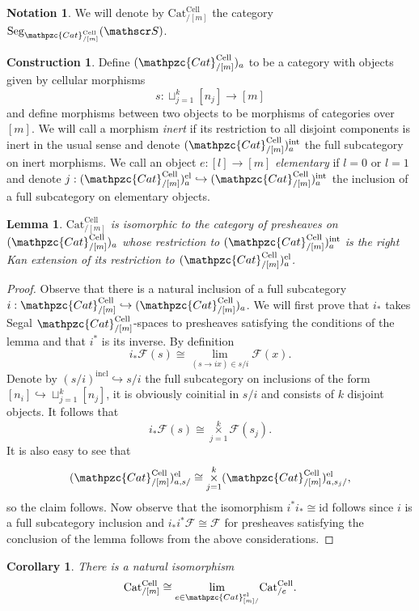 \documentclass[a4paper, reqno]{amsart}
\newtheorem{cor}[theorem]{Corollary}
\newtheorem{lemma}[theorem]{Lemma}
\theoremstyle{definition}
\newtheorem{notation}[theorem]{Notation}
\newtheorem{construction}[theorem]{Construction}
\newcommand\cF{\mathscr F}
\newcommand\cS{\mathscr S}
\newcommand\id{\mathrm{id}}
\newcommand\cat{\mathrm{Cat}}
\newcommand\ccat{\mathpzc{Cat}}
\newcommand\cell{\mathrm{Cell}}
\newcommand\inrt{\mathrm{int}}
\newcommand\el{\mathrm{el}}
\newcommand{\mElo}[2]{\mathpzc{#1}^{\mathrm{el}}_{#2/}}
\begin{document}
\begin{notation}
We will denote by  $\mathrm{Cat}^{\mathrm{Cell}}_{/[m]}$ the category $\mathrm{Seg}_{\mathpzc{Cat}^\mathrm{Cell}_{/[m]}}(\cS)$.
\end{notation}
\begin{construction}\label{constr:corr_aux}
Define $(\ccat^\cell_{/[m]})_a$ to be a category with objects given by cellular morphisms \[s:\sqcup_{j=1}^k[n_j]\rightarrow[m]\]
and define morphisms between two objects to be morphisms of categories over $[m]$. We will call a morphism \textit{inert} if its restriction to all disjoint components is inert in the usual sense and denote $(\ccat^\cell_{/[m]})_a^\inrt$ the full subcategory on inert morphisms. We call an object $e:[l]\rightarrow[m]$ \textit{elementary} if $l=0$ or $l=1$ and denote $j:(\ccat^\cell_{/[m]})_a^\el\hookrightarrow(\ccat^\cell_{/[m]})_a^\inrt$ the inclusion of a full subcategory on elementary objects.
\end{construction}
\begin{lemma}
$\cat^\cell_{/[m]}$ is isomorphic to the category of presheaves on $(\ccat^\cell_{/[m]})_a$ whose restriction to $(\ccat^\cell_{/[m]})_a^\inrt$ is the right Kan extension of its restriction to $(\ccat^\cell_{/[m]})_a^\el$.
\end{lemma}
\begin{proof}
Observe that there is a natural inclusion of a full subcategory $i:\ccat^\cell_{/[m]}\hookrightarrow(\ccat^\cell_{/[m]})_a$. We will first prove that $i_*$ takes Segal $\ccat^\cell_{/[m]}$-spaces to presheaves satisfying the conditions of the lemma and that $i^*$ is its inverse. By definition
\[i_*\cF(s)\cong\underset{(s\rightarrow ix)\in s/i}{\lim}\cF(x).\]
Denote by $(s/i)^\mathrm{incl}\hookrightarrow s/i$ the full subcategory on inclusions of the form $[n_i]\hookrightarrow\sqcup_{j=1}^k[n_j]$, it is obviously coinitial in $s/i$ and consists of $k$ disjoint objects. It follows that 
\[i_*\cF(s)\cong \mathop{\times}\limits_{j=1}^k\cF(s_j).\]
It is also easy to see that 
\[(\ccat^\cell_{/[m]})^\el_{a,s/}\cong \mathop{\times}\limits_{j=1}^k(\ccat^\cell_{/[m]})^\el_{a,s_j/},\]
so the claim follows. Now observe that the isomorphism $i^*i_*\cong\id$ follows since $i$ is a full subcategory inclusion and $i_*i^*\cF\cong\cF$ for presheaves satisfying the conclusion of the lemma follows from the above considerations.
\end{proof}
\begin{cor}\label{cor:iso}
There is a natural isomorphism
\[\mathrm{Cat}^{\mathrm{Cell}}_{/[m]}\cong\underset{e\in\mElo{Cat}{[m]}}{\lim}\mathrm{Cat}^{\mathrm{Cell}}_{/e}.\]
\end{cor}
\end{document}
